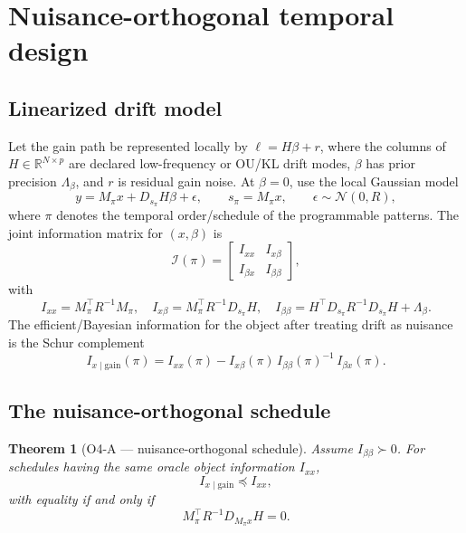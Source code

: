 \documentclass[11pt]{article}
\newtheorem{theorem}{Theorem}
\theoremstyle{remark}
\begin{document}
\section{Nuisance-orthogonal temporal design}
\label{sec:o4}
\subsection{Linearized drift model}
\label{sec:o4-model}
Let the gain path be represented locally by $\ell = H\beta + r$, where the
columns of $H\in\mathbb R^{N\times p}$ are declared low-frequency or OU/KL drift
modes, $\beta$ has prior precision $\Lambda_\beta$, and $r$ is residual gain
noise. At $\beta=0$, use the local Gaussian model
\begin{equation}
y = M_\pi x + D_{s_\pi} H\beta + \epsilon,
\qquad
s_\pi = M_\pi x,
\qquad
\epsilon \sim \mathcal N(0,R),
\tag{O4.1}\label{eq:o4-model}
\end{equation}
where $\pi$ denotes the temporal order/schedule of the programmable patterns.
The joint information matrix for $(x,\beta)$ is
\begin{equation*}
\mathcal I(\pi) =
\begin{bmatrix}
I_{xx} & I_{x\beta} \\
I_{\beta x} & I_{\beta\beta}
\end{bmatrix},
\end{equation*}
with
\begin{equation*}
I_{xx} = M_\pi^\top R^{-1} M_\pi,
\quad
I_{x\beta} = M_\pi^\top R^{-1} D_{s_\pi} H,
\quad
I_{\beta\beta} = H^\top D_{s_\pi} R^{-1} D_{s_\pi} H + \Lambda_\beta.
\end{equation*}
The efficient/Bayesian information for the object after treating drift as
nuisance is the Schur complement
\begin{equation}
I_{x\mid\mathrm{gain}}(\pi)
= I_{xx}(\pi) - I_{x\beta}(\pi)\, I_{\beta\beta}(\pi)^{-1}\, I_{\beta x}(\pi).
\tag{O4.2}\label{eq:o4-schur}
\end{equation}

\subsection{The nuisance-orthogonal schedule}
\label{sec:o4-theorem}
\begin{theorem}[O4-A --- nuisance-orthogonal schedule]
\label{thm:o4a}
Assume $I_{\beta\beta}\succ0$. For schedules having the same oracle object
information $I_{xx}$,
\begin{equation*}
I_{x\mid\mathrm{gain}} \preceq I_{xx},
\end{equation*}
with equality if and only if
\begin{equation}
M_\pi^\top R^{-1} D_{M_\pi x} H = 0.
\tag{O4.3}\label{eq:o4-orth}
\end{equation}
\end{theorem}
\end{document}
